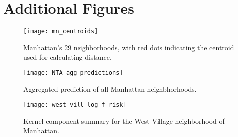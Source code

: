 \clearpage
\label{AppendixA}
\vspace{-1.75cm}
\section{Additional Figures}



 \begin{figure}[h!]
   \centering
     \texttt{[image: mn\_centroids]}
     \caption{Manhattan's 29 neighborhoods, with red dots indicating the centroid used for calculating distance.}
\end{figure}

\begin{figure}[h!]
  \centering
  \caption{Aggregated prediction of all Manhattan neighbhorhoods.}
  \texttt{[image: NTA\_agg\_predictions]}
\end{figure}

\begin{figure}[h!]
  \centering
  \caption{Kernel component summary for the West Village neighborhood of Manhattan.}
  \texttt{[image: west\_vill\_log\_f\_risk]}
\end{figure}
